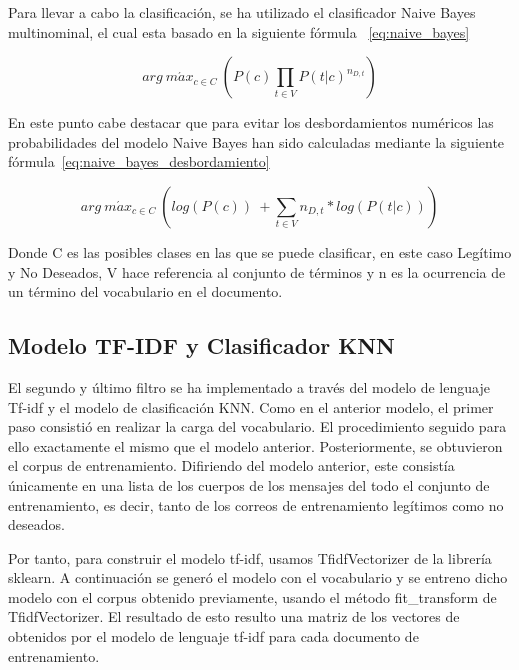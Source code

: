 \documentclass[conference,a4paper]{IEEEtran}
\begin{document}
Para llevar a cabo la clasificación, se ha utilizado el clasificador Naive Bayes multinominal, el cual esta basado en la siguiente fórmula ~\eqref{eq:naive_bayes}

\begin{center}
\begin{equation}
  \label{eq:naive_bayes}
  arg \ m\acute{a}x_{c \in C} \ (P(c) \prod_{t \in 	V} P(t|c)^{n_{D,t}})
\end{equation}
\end{center}

En este punto cabe destacar que para evitar los desbordamientos numéricos las probabilidades del modelo Naive Bayes han sido calculadas mediante la siguiente fórmula~\eqref{eq:naive_bayes_desbordamiento}

\begin{center}
\begin{equation}
  \label{eq:naive_bayes_desbordamiento}
  arg \ m\acute{a}x_{c \in C} \ (log (P(c)) \ + \sum_{t \in 	V} n_{D,t} * log( P(t|c)))
\end{equation}
\end{center}

Donde C es las posibles clases en las que se puede clasificar, en este caso Legítimo y No Deseados, V hace referencia al conjunto de términos y n es la ocurrencia de un término del vocabulario en el documento.

\newpage

\subsection{Modelo TF-IDF y Clasificador KNN}

El segundo y último filtro se ha implementado a través del modelo de lenguaje Tf-idf y el modelo de clasificación KNN. Como en el anterior modelo, el primer paso consistió en realizar la carga del vocabulario. El procedimiento seguido para ello exactamente el mismo que el modelo anterior. Posteriormente, se obtuvieron el corpus de entrenamiento. Difiriendo del modelo anterior, este consistía únicamente en una lista de los cuerpos de los mensajes del todo el conjunto de entrenamiento, es decir, tanto de los correos de entrenamiento legítimos como no deseados. 

Por tanto, para construir el modelo tf-idf, usamos  TfidfVectorizer de la librería sklearn. A continuación se generó el modelo con el vocabulario y se entreno dicho modelo con el corpus obtenido previamente, usando el método fit\_transform de TfidfVectorizer. El resultado de esto resulto una matriz de los vectores de obtenidos por el modelo de lenguaje tf-idf para cada documento de entrenamiento.
\end{document}
